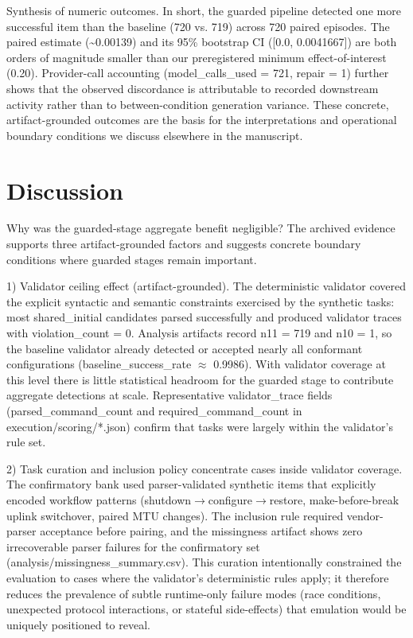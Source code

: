 \documentclass[conference]{IEEEtran}
\begin{document}
Synthesis of numeric outcomes. In short, the guarded pipeline detected one more successful item than the baseline (720 vs. 719) across 720 paired episodes. The paired estimate (\textasciitilde{}0.00139) and its 95\% bootstrap CI ([0.0, 0.0041667]) are both orders of magnitude smaller than our preregistered minimum effect-of-interest (0.20). Provider-call accounting (model\_calls\_used = 721, repair = 1) further shows that the observed discordance is attributable to recorded downstream activity rather than to between-condition generation variance. These concrete, artifact-grounded outcomes are the basis for the interpretations and operational boundary conditions we discuss elsewhere in the manuscript.

\section{Discussion}
Why was the guarded-stage aggregate benefit negligible? The archived evidence supports three artifact-grounded factors and suggests concrete boundary conditions where guarded stages remain important.

1) Validator ceiling effect (artifact-grounded). The deterministic validator covered the explicit syntactic and semantic constraints exercised by the synthetic tasks: most shared\_initial candidates parsed successfully and produced validator traces with violation\_count = 0. Analysis artifacts record n11 = 719 and n10 = 1, so the baseline validator already detected or accepted nearly all conformant configurations (baseline\_success\_rate \ensuremath{\approx} 0.9986). With validator coverage at this level there is little statistical headroom for the guarded stage to contribute aggregate detections at scale. Representative validator\_trace fields (parsed\_command\_count and required\_command\_count in execution/scoring/*.json) confirm that tasks were largely within the validator's rule set.

2) Task curation and inclusion policy concentrate cases inside validator coverage. The confirmatory bank used parser-validated synthetic items that explicitly encoded workflow patterns (shutdown\ensuremath{\rightarrow}configure\ensuremath{\rightarrow}restore, make-before-break uplink switchover, paired MTU changes). The inclusion rule required vendor-parser acceptance before pairing, and the missingness artifact shows zero irrecoverable parser failures for the confirmatory set (analysis/missingness\_summary.csv). This curation intentionally constrained the evaluation to cases where the validator's deterministic rules apply; it therefore reduces the prevalence of subtle runtime-only failure modes (race conditions, unexpected protocol interactions, or stateful side-effects) that emulation would be uniquely positioned to reveal.
\end{document}
